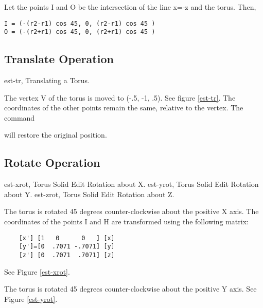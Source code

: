 Let the points I and O be the intersection of the line x=-z and the torus.
Then,
\begin{center}
\begin{verbatim}
I = (-(r2-r1) cos 45, 0, (r2-r1) cos 45 )
O = (-(r2+r1) cos 45, 0, (r2+r1) cos 45 )
\end{verbatim}
\end{center}

\subsection{Translate Operation}
\mfig est-tr, Translating a Torus.


The vertex V of the torus is moved to (-.5, -1, .5).
See figure \ref{est-tr}.  The
coordinates of the other points remain the same, relative to the vertex.
The command


will restore the original position.

\subsection{Rotate Operation}
\mfig est-xrot, Torus Solid Edit Rotation about X.
\mfig est-yrot, Torus Solid Edit Rotation about Y.
\mfig est-zrot, Torus Solid Edit Rotation about Z.


The torus is rotated 45 degrees counter-clockwise about the positive X axis.
The
coordinates of the points I and H are transformed using the following matrix:
\begin{verbatim}
    [x'] [1   0      0   ] [x]
    [y']=[0  .7071 -.7071] [y]
    [z'] [0  .7071  .7071] [z]
\end{verbatim}
See Figure \ref{est-xrot}.


The torus is rotated 45 degrees counter-clockwise about the positive Y axis.
See Figure \ref{est-yrot}.

